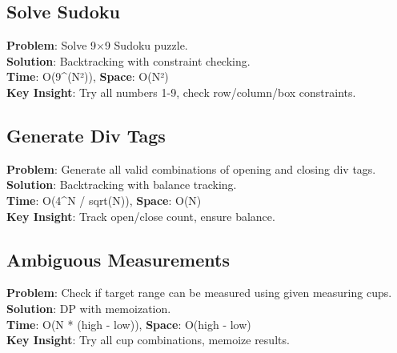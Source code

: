 \documentclass{report}
\begin{document}
\subsection{Solve Sudoku}
\textbf{Problem}: Solve 9×9 Sudoku puzzle.\\
\textbf{Solution}: Backtracking with constraint checking.\\
\textbf{Time}: O(9\textasciicircum (N²)), \textbf{Space}: O(N²)\\
\textbf{Key Insight}: Try all numbers 1-9, check row/column/box constraints.

\subsection{Generate Div Tags}
\textbf{Problem}: Generate all valid combinations of opening and closing div tags.\\
\textbf{Solution}: Backtracking with balance tracking.\\
\textbf{Time}: O(4\textasciicircum N / sqrt(N)), \textbf{Space}: O(N)\\
\textbf{Key Insight}: Track open/close count, ensure balance.

\subsection{Ambiguous Measurements}
\textbf{Problem}: Check if target range can be measured using given measuring cups.\\
\textbf{Solution}: DP with memoization.\\
\textbf{Time}: O(N * (high - low)), \textbf{Space}: O(high - low)\\
\textbf{Key Insight}: Try all cup combinations, memoize results.
\end{document}
